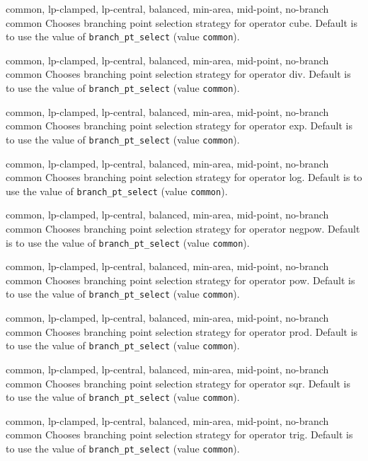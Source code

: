 %
{common, lp-clamped, lp-central, balanced, min-area, mid-point, no-branch}%
{common}%
{Chooses branching point selection strategy for operator cube.
Default is to use the value of \texttt{branch\_pt\_select} (value \texttt{common}).}%
{}

%
{common, lp-clamped, lp-central, balanced, min-area, mid-point, no-branch}%
{common}%
{Chooses branching point selection strategy for operator div.
Default is to use the value of \texttt{branch\_pt\_select} (value \texttt{common}).}%
{}

%
{common, lp-clamped, lp-central, balanced, min-area, mid-point, no-branch}%
{common}%
{Chooses branching point selection strategy for operator exp.
Default is to use the value of \texttt{branch\_pt\_select} (value \texttt{common}).}%
{}

%
{common, lp-clamped, lp-central, balanced, min-area, mid-point, no-branch}%
{common}%
{Chooses branching point selection strategy for operator log.
Default is to use the value of \texttt{branch\_pt\_select} (value \texttt{common}).}%
{}

%
{common, lp-clamped, lp-central, balanced, min-area, mid-point, no-branch}%
{common}%
{Chooses branching point selection strategy for operator negpow.
Default is to use the value of \texttt{branch\_pt\_select} (value \texttt{common}).}%
{}

%
{common, lp-clamped, lp-central, balanced, min-area, mid-point, no-branch}%
{common}%
{Chooses branching point selection strategy for operator pow.
Default is to use the value of \texttt{branch\_pt\_select} (value \texttt{common}).}%
{}

%
{common, lp-clamped, lp-central, balanced, min-area, mid-point, no-branch}%
{common}%
{Chooses branching point selection strategy for operator prod.
Default is to use the value of \texttt{branch\_pt\_select} (value \texttt{common}).}%
{}

%
{common, lp-clamped, lp-central, balanced, min-area, mid-point, no-branch}%
{common}%
{Chooses branching point selection strategy for operator sqr.
Default is to use the value of \texttt{branch\_pt\_select} (value \texttt{common}).}%
{}

%
{common, lp-clamped, lp-central, balanced, min-area, mid-point, no-branch}%
{common}%
{Chooses branching point selection strategy for operator trig.
Default is to use the value of \texttt{branch\_pt\_select} (value \texttt{common}).}%
{}

